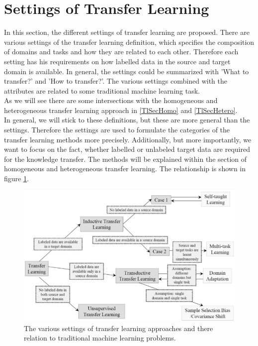 \section{Settings of Transfer Learning}\label{DefTlSecSett} %
In this section, the different settings of transfer learning are proposed.
There are various settings of the transfer learning definition, which specifies the composition of domains and tasks and how they are related to each other.
Therefore each setting has his requirements on how labelled data in the source and target domain is available.
In general, the settings could be summarized with 'What to transfer?' and 'How to transfer?'.
The various settings combined with the attributes are related to some traditional machine learning task.\cite{Pan.2010}\\
As we will see there are some intersections with the homogeneous and heterogeneous transfer learning approach in \ref{TlSecHomo} and \ref{TlSecHetero}.\cite[p. 5-6]{Weiss.2016}\\
In general, we will stick to these definitions, but these are more general than the settings.
Therefore the settings are used to formulate the categories of the transfer learning methods more precisely.
Additionally, but more importantly, we want to focus on the fact, whether labelled or unlabeled target data are required for the knowledge transfer.
The methods will be explained within the section of homogeneous and heterogeneous transfer learning.
The relationship is shown in figure \ref{FigSettingsTransferLearning}.
\begin{figure}
	\centering
	\includegraphics[width=.8\linewidth]{figures/SettingsTransferLearning.png}
	\caption[Settings of Transfer Learning]{The various settings of transfer learning approaches and there relation to traditional machine learning problems.\cite{Pan.2010}}
	\label{FigSettingsTransferLearning}
\end{figure}

